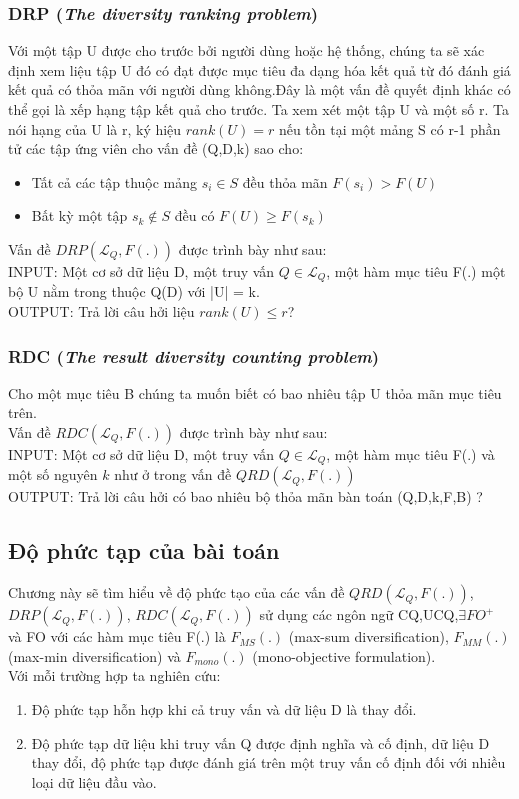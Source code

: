 \documentclass[12pt]{report}
\begin{document}
	\subsubsection{DRP  (\textit{The diversity ranking problem}) }
	Với một tập U được cho trước bởi người dùng hoặc hệ thống, chúng ta sẽ xác định xem liệu tập U đó có đạt được mục tiêu đa dạng hóa kết quả từ đó đánh giá kết quả có thỏa mãn với người dùng không.Đây là một vấn đề quyết định khác có thể gọi là xếp hạng tập kết quả cho trước. Ta xem xét một tập U và một số r. Ta nói hạng của U là r, ký hiệu $ rank(U) = r$ nếu tồn tại một mảng S có r-1 phần tử các tập ứng viên cho vấn đề (Q,D,k) sao cho:\\
	 \begin{itemize}
  	 \item Tất cả các tập thuộc mảng $s_i \in S $ đều thỏa mãn $F(s_i) > F(U)$
 	 \item Bất kỳ một tập $s_k \notin S $ đều có $F(U) \ge F(s_k)$
  	 \end{itemize}
	Vấn đề $DRP(\mathcal{L}_Q,F(.))$ được trình bày như sau: \\
	INPUT: 	Một cơ sở dữ liệu D, một truy vấn $Q\in \mathcal{L}_Q$, một hàm mục tiêu F(.) một bộ U nằm trong thuộc Q(D) với |U| = k.\\
	OUTPUT: Trả lời câu hởi liệu $rank(U) \le r$?
	\subsubsection{RDC  (\textit{The result diversity counting problem}) }
	Cho một mục tiêu B chúng ta muốn biết có bao nhiêu tập U thỏa mãn mục tiêu trên.\\
	Vấn đề $RDC(\mathcal{L}_Q,F(.))$ được trình bày như sau: \\
	INPUT: 	Một cơ sở dữ liệu D, một truy vấn $Q\in \mathcal{L}_Q$, một hàm mục tiêu F(.) và một số nguyên $k$ như ở trong vấn đề $QRD(\mathcal{L}_Q,F(.))$ \\
	OUTPUT: Trả lời câu hởi có bao nhiêu bộ thỏa mãn bàn toán (Q,D,k,F,B) ?
\subsection{Độ phức tạp của bài toán}
Chương này sẽ tìm hiểu về độ phức tạo của các vấn đề  $QRD(\mathcal{L}_Q,F(.))$, $DRP(\mathcal{L}_Q,F(.))$, $RDC(\mathcal{L}_Q,F(.))$ sử dụng các ngôn ngữ CQ,UCQ,$\exists FO^+$ và FO với các hàm mục tiêu F(.) là $F_{MS}(.)$  (max-sum diversification), $F_{MM}(.)$ (max-min diversification) và $F_{mono}(.)$ (mono-objective formulation).\\
Với mỗi trường hợp ta nghiên cứu:
	\begin{enumerate}
		\item Độ phức tạp hỗn hợp khi cả truy vấn và dữ liệu D là thay đổi.
		\item Độ phức tạp dữ liệu khi truy vấn Q được định nghĩa và cố định, dữ liệu D thay đổi, độ phức tạp được đánh giá trên một truy vấn cố định đối với nhiều loại dữ liệu đầu vào.
	\end{enumerate} 
\end{document}
